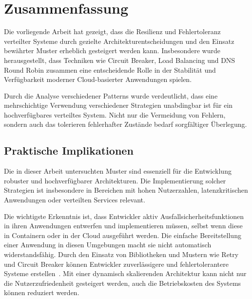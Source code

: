 \section{Zusammenfassung}



Die vorliegende Arbeit hat gezeigt, dass die Resilienz und Fehlertoleranz verteilter Systeme durch gezielte Architekturentscheidungen und den Einsatz bewährter Muster erheblich gesteigert werden kann. Insbesondere wurde herausgestellt, dass Techniken wie Circuit Breaker, Load Balancing und DNS Round Robin zusammen eine entscheidende Rolle in der Stabilität und Verfügbarkeit moderner Cloud-basierter Anwendungen spielen.

Durch die Analyse verschiedener Patterns wurde verdeutlicht, dass eine mehrschichtige Verwendung verschiedener Strategien unabdingbar ist für ein hochverfügbares verteiltes System. Nicht nur die Vermeidung von Fehlern, sondern auch das tolerieren fehlerhafter Zustände bedarf sorgfältiger Überlegung.

\subsection{Praktische Implikationen}
Die in dieser Arbeit untersuchten Muster sind essenziell für die Entwicklung robuster und hochverfügbarer Architekturen. Die Implementierung solcher Strategien ist insbesondere in Bereichen mit hohen Nutzerzahlen, latenzkritischen Anwendungen oder verteilten Services relevant.

Die wichtigste Erkenntnis ist, dass Entwickler aktiv Ausfallsicherheitsfunktionen
in ihren Anwendungen entwerfen und implementieren müssen, selbst wenn diese in Containern oder in der Cloud ausgeführt werden.
Die einfache Bereitstellung einer Anwendung in diesen Umgebungen macht sie nicht automatisch widerstandsfähig.
Durch den Einsatz von Bibliotheken und Mustern wie Retry und Circuit Breaker können Entwickler zuverlässigere und
fehlertolerantere Systeme erstellen~\cite{Haley.28.06.2018}. Mit einer dynamisch skalierenden Architektur kann nicht nur die Nutzerzufriedenheit gesteigert werden, auch die Betriebskosten des Systems können reduziert werden.
